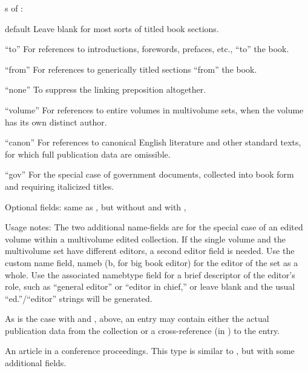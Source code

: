 \documentclass{ltxdockit}[2010/02/12]
\begin{document}
\begin{typelist}
s of :
\begin{valuelist}
\item[default] Leave  blank for most sorts of titled book sections.
\item[``to''] For references to introductions, forewords, prefaces, etc., ``to'' the book.
\item[``from''] For references to generically titled sections ``from'' the book.
\item[``none''] To suppress the linking preposition altogether.
\item[``volume''] For references to entire volumes in multivolume sets, when the volume has its own distinct author.
\item[``canon''] For references to canonical English literature and other standard texts, for which full publication data are omissible.
\item[``gov''] For the special case of government documents, collected into book form and requiring italicized titles.
\end{valuelist}


\item Optional fields: same as , but without  and with , 


Usage notes: The two additional name-fields are for the special case of an edited volume within a multivolume edited collection. If the single volume and the multivolume set have different editors, a second editor field is needed. Use the custom name field, nameb (b, for big book editor) for the editor of the set as a whole. Use the associated namebtype field for a brief descriptor of the editor's role, such as ``general editor'' or ``editor in chief,'' or leave blank and the usual ``ed.''/``editor'' strings will be generated.

As is the case with  and  , above, an  entry may contain either the actual publication data from the collection or a cross-reference (in ) to the  entry. 




An article in a conference proceedings. This type is similar to , but with some additional fields.


\end{typelist}
\end{document}

